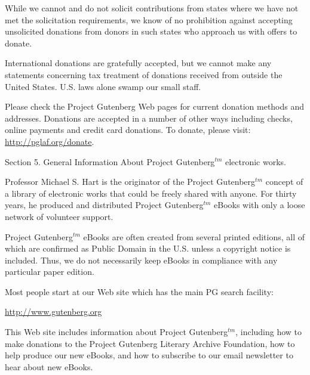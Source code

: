 While we cannot and do not solicit contributions from states where we
have not met the solicitation requirements, we know of no prohibition
against accepting unsolicited donations from donors in such states who
approach us with offers to donate.

International donations are gratefully accepted, but we cannot make
any statements concerning tax treatment of donations received from
outside the United States.  U.S. laws alone swamp our small staff.

Please check the Project Gutenberg Web pages for current donation
methods and addresses.  Donations are accepted in a number of other
ways including checks, online payments and credit card donations.
To donate, please visit: \url{http://pglaf.org/donate}.


Section 5.  General Information About Project Gutenberg$^{tm}$ electronic
works.

Professor Michael S. Hart is the originator of the Project Gutenberg$^{tm}$
concept of a library of electronic works that could be freely shared
with anyone.  For thirty years, he produced and distributed Project
Gutenberg$^{tm}$ eBooks with only a loose network of volunteer support.


Project Gutenberg$^{tm}$ eBooks are often created from several printed
editions, all of which are confirmed as Public Domain in the U.S.
unless a copyright notice is included.  Thus, we do not necessarily
keep eBooks in compliance with any particular paper edition.


Most people start at our Web site which has the main PG search facility:

     \url{http://www.gutenberg.org}

This Web site includes information about Project Gutenberg$^{tm}$,
including how to make donations to the Project Gutenberg Literary
Archive Foundation, how to help produce our new eBooks, and how to
subscribe to our email newsletter to hear about new eBooks.
